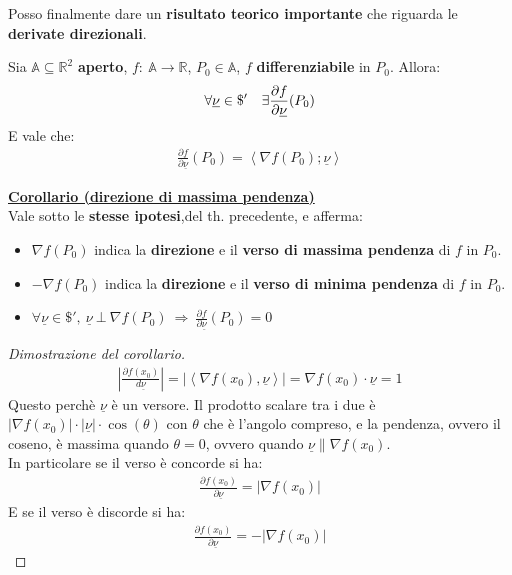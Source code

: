 \documentclass[a4paper, oneside]{article}
\newcommand\R{\mathbb{R}}
\newcommand\A{\mathbb{A}}
\newcommand\de{\partial}
\begin{document}
    \noindent Posso finalmente dare un \textbf{risultato teorico importante} che riguarda le \textbf{derivate direzionali}.

    \begin{theorem}
        Sia $\A\subseteq\R^2$ \textbf{aperto}, $f: \ \A\to\R$, $P_0\in\A$, $f$ \textbf{differenziabile} in $P_0$. Allora:\\
        \[\forall\underline{\nu}\in\$' \quad \exists\frac{\de f}{\de\underline{\nu}}(P_0)\\\]  
        E vale che:
        \begin{gather*}
        \frac{\de f}{\de\underline{\nu}}(P_0) = \left\langle \nabla f(P_0);\underline{\nu}\right\rangle 
        \end{gather*}
    \end{theorem}
    \noindent\textbf{\underline{Corollario (direzione di massima pendenza)}}\\
    Vale sotto le \textbf{stesse ipotesi},del th. precedente, e afferma:
    \begin{itemize}
        \item $\nabla f(P_0)$ indica la \textbf{direzione} e il \textbf{verso di massima pendenza} di $f$ in $P_0$.
        \item $-\nabla f(P_0)$ indica la \textbf{direzione} e il \textbf{verso di minima pendenza} di $f$ in $P_0$.
        \item $\displaystyle\forall\underline{\nu}\in\$', \ \underline{\nu} \ \bot \ \nabla f (P_0) \ \Rightarrow \ \frac{\de f}{\de\underline{\nu}}(P_0) = 0$
    \end{itemize}
    \begin{proof}[Dimostrazione del corollario]
        \begin{gather*}
            \left\lvert \frac{\de f(x_0)}{d\underline{\nu}} \right\rvert = \left\lvert \left\langle \nabla f(x_0), \underline{\nu} \right\rangle \right\rvert  = \nabla f(x_0) \cdot \underline{\nu} = 1  
        \end{gather*}
        Questo perchè $\underline{\nu}$ è un versore. Il prodotto scalare tra i due è $\left\lvert \nabla f(x_0) \right\rvert \cdot \left\lvert \underline{\nu} \right\rvert \cdot \cos(\theta)$ con $\theta$ che è l'angolo compreso, e la pendenza, ovvero il coseno, è massima quando $\theta = 0$, ovvero quando $\underline{\nu} \parallel \nabla f(x_0)$.\\
        In particolare se il verso è concorde si ha:
        \begin{gather*}
            \frac{\de f(x_0)}{\de \underline{\nu}} = \left\lvert \nabla f(x_0) \right\rvert
        \end{gather*}
        E se il verso è discorde si ha:
        \begin{gather*}
            \frac{\de f(x_0)}{\de \underline{\nu}} = -\left\lvert \nabla f(x_0) \right\rvert
        \end{gather*}
    \end{proof}
\end{document}
